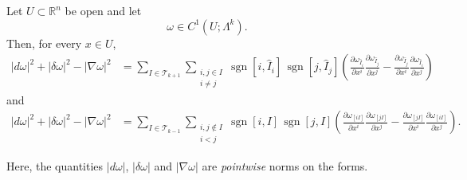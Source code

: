 \begin{lemma}
\label{lemma:pointwise_identity}
Let $U\subset\mathbb{R}^n$ be open and let
\[
    \omega\in C^1(U;\Lambda^k).
\]
Then, for every $x\in U$,
\[
\begin{aligned}\label{lem23_1}
    |d\omega|^2+|\delta\omega|^2-|\nabla\omega|^2
    &=
    \sum_{I\in\mathscr{T}_{k+1}}
    \sum_{\substack{i,j\in I\\i\neq j}}
    \operatorname{sgn}[i,\widehat{I}_i]\,
    \operatorname{sgn}[j,\widehat{I}_j]
    \left(
        \frac{\partial\omega_{\widehat{I}_i}}{\partial x^i}
        \frac{\partial\omega_{\widehat{I}_j}}{\partial x^j}
        -
        \frac{\partial\omega_{\widehat{I}_j}}{\partial x^i}
        \frac{\partial\omega_{\widehat{I}_i}}{\partial x^j}
    \right)
\end{aligned}
\tag{17}
\]
and
\[
\begin{aligned}\label{lem23_2}
    |d\omega|^2+|\delta\omega|^2-|\nabla\omega|^2
    &=
    \sum_{I\in\mathscr{T}_{k-1}}
    \sum_{\substack{i,j\notin I\\i<j}}
    \operatorname{sgn}[i,I]\,
    \operatorname{sgn}[j,I]
    \left(
        \frac{\partial\omega_{[iI]}}{\partial x^i}
        \frac{\partial\omega_{[jI]}}{\partial x^j}
        -
        \frac{\partial\omega_{[jI]}}{\partial x^i}
        \frac{\partial\omega_{[iI]}}{\partial x^j}
    \right).
\end{aligned}
\tag{18}
\]
\end{lemma}
\begin{remark}
    Here, the quantities $|d\omega|$, $|\delta \omega|$ and $|\nabla \omega|$ are \emph{pointwise} norms on the forms. 
\end{remark}


